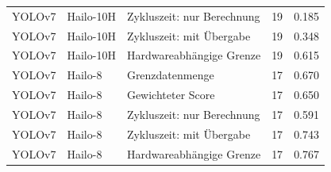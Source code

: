 \begin{longtable}{@{}llp{5.3cm}rr@{}}
YOLOv7 & Hailo-10H & Zykluszeit: nur Berechnung & 19 & 0.185 \\
YOLOv7 & Hailo-10H & Zykluszeit: mit Übergabe & 19 & 0.348 \\
YOLOv7 & Hailo-10H & Hardwareabhängige Grenze & 19 & 0.615 \\
YOLOv7 & Hailo-8 & Grenzdatenmenge & 17 & 0.670 \\
YOLOv7 & Hailo-8 & Gewichteter Score & 17 & 0.650 \\
YOLOv7 & Hailo-8 & Zykluszeit: nur Berechnung & 17 & 0.591 \\
YOLOv7 & Hailo-8 & Zykluszeit: mit Übergabe & 17 & 0.743 \\
YOLOv7 & Hailo-8 & Hardwareabhängige Grenze & 17 & 0.767 \\
\bottomrule\end{longtable}
